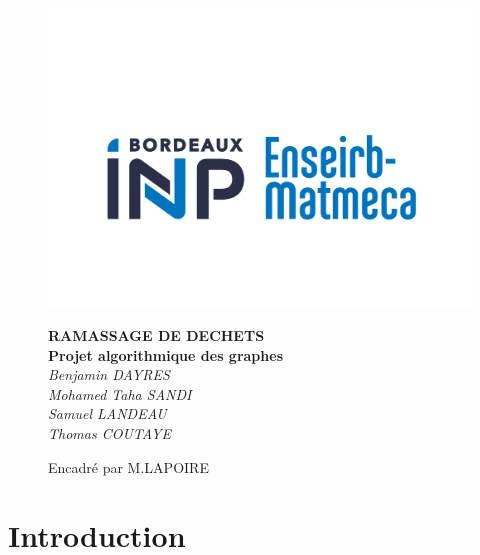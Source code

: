 \documentclass{report}
\begin{document}
\begin{titlepage}
\fancypagestyle{}{}
\begin{figure}[t]
    \centerline{\includegraphics[scale=0.4]{Logo.png}}
    \centering
	\vspace{1cm}
    {\huge\bfseries RAMASSAGE DE DECHETS \\}
    {\huge\bfseries Projet algorithmique des graphes \\}
	\vspace{2cm}
	{\Large\itshape Benjamin DAYRES \\ Mohamed Taha SANDI \\ Samuel LANDEAU \\ Thomas COUTAYE \\}
	\vspace{1cm}
	{\large Encadr\'e par M.LAPOIRE\par}
    

\end{figure}
\end{titlepage}

\newpage

\renewcommand{\contentsname}{Table des matières}
\tableofcontents

\newpage

\section{\Large Introduction }
\end{document}
